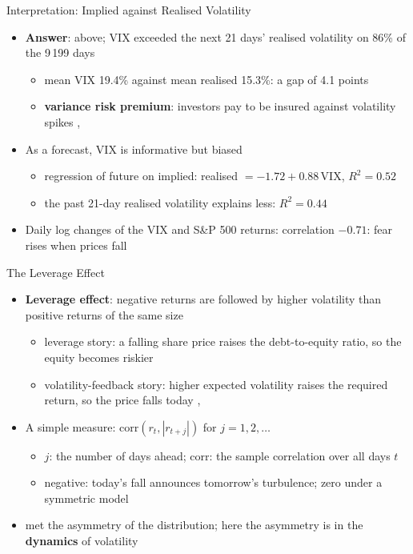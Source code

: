 \begin{frame}{Interpretation: Implied against Realised Volatility}
\itemsize{\small}
\begin{itemize}
    \item \textbf{Answer}: above; VIX exceeded the next 21 days' realised volatility on 86\% of the 9\,199 days
    \begin{itemize}
        \item mean VIX 19.4\% against mean realised 15.3\%: a gap of 4.1 points
        \item \textbf{variance risk premium}: investors pay to be insured against volatility spikes , 
    \end{itemize}
    \item As a forecast, VIX is informative but biased
    \begin{itemize}
        \item regression of future on implied: realised $= -1.72 + 0.88\,$VIX, $R^2 = 0.52$
        \item the past 21-day realised volatility explains less: $R^2 = 0.44$
    \end{itemize}
    \item Daily log changes of the VIX and S\&P 500 returns: correlation $-0.71$: fear rises when prices fall
\end{itemize}
\end{frame}

\begin{frame}{The Leverage Effect}
\itemsize{\small}
\begin{itemize}
    \item \textbf{Leverage effect}: negative returns are followed by higher volatility than positive returns of the same size 
    \begin{itemize}
        \item leverage story: a falling share price raises the debt-to-equity ratio, so the equity becomes riskier
        \item volatility-feedback story: higher expected volatility raises the required return, so the price falls today , 
    \end{itemize}
    \item A simple measure: $\mathrm{corr}(r_t, |r_{t+j}|)$ for $j = 1, 2, \dots$
    \begin{itemize}
        \item $j$: the number of days ahead; $\mathrm{corr}$: the sample correlation over all days $t$
        \item negative: today's fall announces tomorrow's turbulence; zero under a symmetric model
    \end{itemize}
    \item {} met the asymmetry of the distribution; here the asymmetry is in the \textbf{dynamics} of volatility
\end{itemize}
\end{frame}

